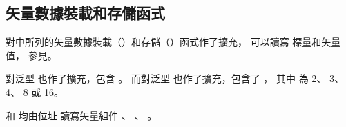 \subsection[sec:vectorLsFuncHalf]{矢量數據裝載和存儲函式}

對中所列的矢量數據裝載（）和存儲（）函式作了擴充，
可以讀寫  標量和矢量值，
參見。

對泛型  也作了擴充，包含 。
而對泛型  也作了擴充，包含了 ，
其中  為 2、 3、 4、 8 或 16。

\startnotepar
{} 和 
均由位址  讀寫矢量組件 、 、 。
\stopnotepar

{}
